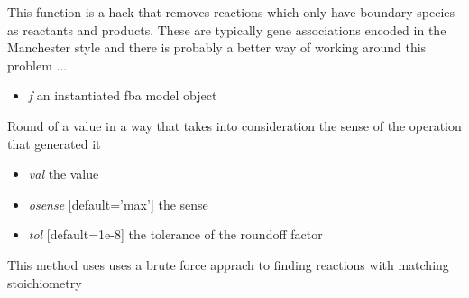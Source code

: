 \documentclass[a4paper,11pt,english]{sphinxmanual}
\begin{document}

\begin{fulllineitems}
\label{modules_doc:cbmpy.CBTools.removeFixedSpeciesReactions}
This function is a hack that removes reactions which only have boundary species as reactants
and products. These are typically gene associations encoded in the Manchester style and there
is probably a better way of working around this problem ...
\begin{itemize}
\item {} 
\emph{f} an instantiated fba model object

\end{itemize}

\end{fulllineitems}


\begin{fulllineitems}
\label{modules_doc:cbmpy.CBTools.roundOffWithSense}
Round of a value in a way that takes into consideration the sense of the operation that generated it
\begin{itemize}
\item {} 
\emph{val} the value

\item {} 
\emph{osense} {[}default='max'{]} the sense

\item {} 
\emph{tol} {[}default=1e-8{]} the tolerance of the roundoff factor

\end{itemize}

\end{fulllineitems}


\begin{fulllineitems}
\label{modules_doc:cbmpy.CBTools.scanForReactionDuplicates}
This method uses uses a brute force apprach to finding reactions with matching
stoichiometry

\end{fulllineitems}
\end{document}
